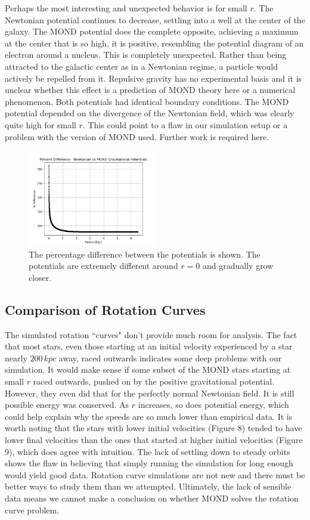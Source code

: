 \documentclass[11pt, twocolumn]{article}
\begin{document}
    Perhaps the most interesting and unexpected behavior is for small $r$. The Newtonian potential continues to decrease, settling into a well at the center of the galaxy. The MOND potential does the complete opposite, achieving a maximum at the center that is so high, it is positive, resembling the potential diagram of an electron around a nucleus. This is completely unexpected. Rather than being attracted to the galactic center as in a Newtonian regime, a particle would actively be repelled from it. Repulsive gravity has no experimental basis and it is unclear whether this effect is a prediction of MOND theory here or a numerical phenomenon. Both potentials had identical boundary conditions. The MOND potential depended on the divergence of the Newtonian field, which was clearly quite high for small $r$. This could point to a flaw in our simulation setup or a problem with the version of MOND used. Further work is required here. 

    \begin{figure}[h]
        \includegraphics[width=0.5\textwidth]{images/perdiff.png}
        \caption{The percentage difference between the potentials is shown. The potentials are extremely different around $r = 0$ and gradually grow closer.}
        \label{fig:rotation}
    \end{figure}
    
    \subsection*{Comparison of Rotation Curves}
    The simulated rotation ``curves" don't provide much room for analysis. The fact that most stars, even those starting at an initial velocity experienced by a star nearly $200 \, \si{kpc}$ away, raced outwards indicates some deep problems with our simulation. It would make sense if some subset of the MOND stars starting at small $r$ raced outwards, pushed on by the positive gravitational potential. However, they even did that for the perfectly normal Newtonian field. It is still possible energy was conserved. As $r$ increases, so does potential energy, which could help explain why the speeds are so much lower than empirical data. It is worth noting that the stars with lower initial velocities (Figure 8) tended to have lower final velocities than the ones that started at higher initial velocities (Figure 9), which does agree with intuition. The lack of settling down to steady orbits shows the flaw in believing that simply running the simulation for long enough would yield good data. Rotation curve simulations are not new and there must be better ways to study them than we attempted. Ultimately, the lack of sensible data means we cannot make a conclusion on whether MOND solves the rotation curve problem.
\end{document}
